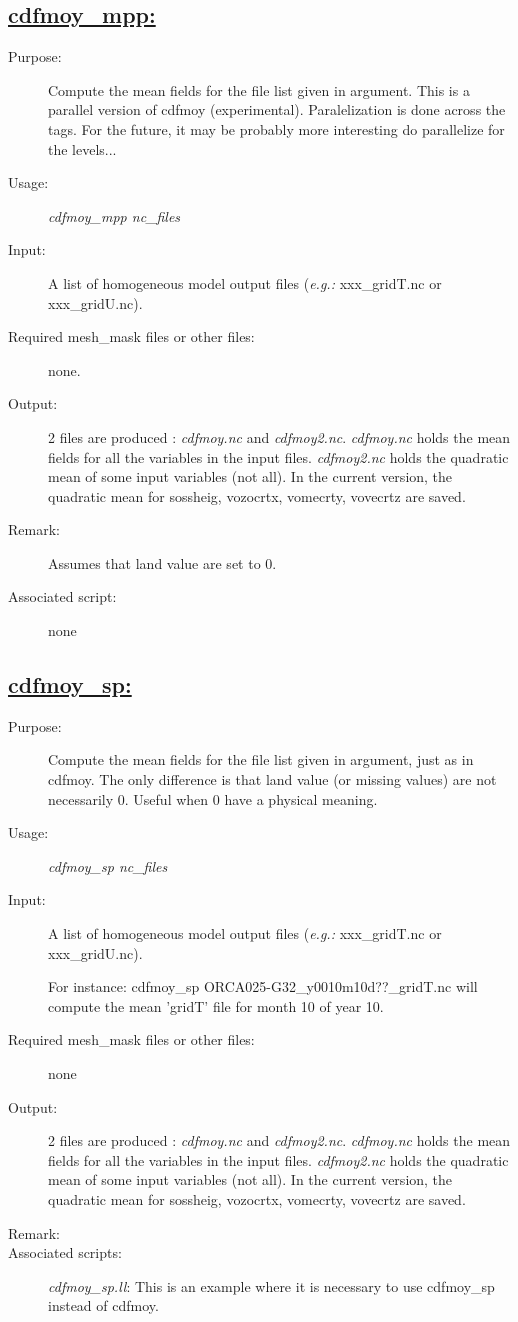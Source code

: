 \documentclass[a4paper,11pt]{article}
\begin{document}
\subsection*{\underline{cdfmoy\_mpp:}}
\begin{description}
\item[Purpose:] Compute the mean fields for the file list given in argument. This is a parallel version of cdfmoy (experimental). 
  Paralelization  is done across the tags. For the future, it may be probably more interesting do parallelize for the levels...
\item[Usage:] {\em cdfmoy\_mpp nc\_files }
\item[Input:] A list of homogeneous model output files ({\em e.g.: } xxx\_gridT.nc or xxx\_gridU.nc). \
\item[Required mesh\_mask files or other files:]  none.
\item[Output:] 2 files are produced : {\em cdfmoy.nc} and {\em cdfmoy2.nc}. {\em cdfmoy.nc} holds the mean fields
for all the variables in the input files. {\em cdfmoy2.nc} holds the quadratic mean of some input variables (not all). 
In the current version, the quadratic mean for sossheig, vozocrtx, vomecrty, vovecrtz are saved.
\item[Remark:] Assumes that land value are set to 0.
\item[Associated script:] none
\end{description}


\subsection*{\underline{cdfmoy\_sp:}}
\begin{description}
\item[Purpose:] Compute the mean fields for the file list given in argument, just as in cdfmoy. The only difference
is that land value (or missing values) are not necessarily 0. Useful when 0 have a physical meaning.
\item[Usage:] {\em cdfmoy\_sp nc\_files }
\item[Input:] A list of homogeneous model output files ({\em e.g.: } xxx\_gridT.nc or xxx\_gridU.nc). \

For instance: cdfmoy\_sp ORCA025-G32\_y0010m10d??\_gridT.nc will compute the mean 'gridT' file for month 10 of year 10.
\item[Required mesh\_mask files or other files:]  none
\item[Output:] 2 files are produced : {\em cdfmoy.nc} and {\em cdfmoy2.nc}. {\em cdfmoy.nc} holds the mean fields
for all the variables in the input files. {\em cdfmoy2.nc} holds the quadratic mean of some input variables (not all). 
In the current version, the quadratic mean for sossheig, vozocrtx, vomecrty, vovecrtz are saved.
\item[Remark:] 
\item[Associated scripts:] {\em cdfmoy\_sp.ll}: This is an example where it is necessary to use cdfmoy\_sp instead of
cdfmoy. 
\end{description}
\end{document}
